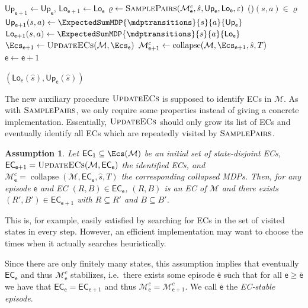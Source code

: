 \documentclass{theoretics}
\newcommand{\MDP}{\mathcal{M}}
\newcommand{\initialstate}{\hat{s}}
\newcommand{\finitepath}{\varrho}
\newcommand{\upperbound}{\mathsf{Up}}
\newcommand{\lowerbound}{\mathsf{Lo}}
\newcommand{\targetset}{T}
\newcommand{\samplepath}{\textsc{SamplePairs}}
\DeclareMathOperator{\collapse}{collapse}
\newcommand{\updateecs}{\textsc{UpdateECs}}
\newcommand{\algoepisode}{\mathsf{e}}
\newcommand{\algoecs}{\mathsf{EC}}
\newtheorem{assumption}{Assumption}
\begin{document}
\begin{algorithm}[t]
{ 		$\upperbound_{\algoepisode + 1} \gets \upperbound_\algoepisode$, $\lowerbound_{\algoepisode + 1} \gets \lowerbound_\algoepisode$ \;
 		$\finitepath \gets \samplepath(\MDP^c_\algoepisode, \initialstate, \upperbound_\algoepisode, \lowerbound_\algoepisode, \varepsilon)$   		
 		\ForAll(){$(s,a) \in \finitepath$}{ 
 			$\upperbound_{\algoepisode + 1}(s, a) \gets \ExpectedSumMDP{\mdptransitions}{s}{a}{\upperbound_\algoepisode}$ \label{alg:brtdp:line:update_u} \;
 			$\lowerbound_{\algoepisode + 1}(s, a) \gets \ExpectedSumMDP{\mdptransitions}{s}{a}{\lowerbound_\algoepisode}$ \label{alg:brtdp:line:update_l} \;
 		}
 		$\Ecs_{\algoepisode + 1} \gets \updateecs(\MDP, \Ecs_\algoepisode)$  
 		$\MDP^c_{\algoepisode + 1} \gets \collapse(\MDP, \Ecs_{\algoepisode + 1}, \initialstate, \targetset)$  \label{alg:brtdp:line:collapse} 		
 		$\algoepisode \gets \algoepisode + 1$ \;
 	}
 	
 	\Return $(\lowerbound_\algoepisode(\initialstate), \upperbound_\algoepisode(\initialstate))$ \;
 \end{algorithm}
 
The new auxiliary procedure $\updateecs$ is supposed to identify ECs in $\MDP$.
As with $\samplepath$, we only require some properties instead of giving a concrete implementation.
Essentially, $\updateecs$ should only grow its list of ECs and eventually identify all ECs which are repeatedly visited by $\samplepath$.

\begin{assumption} \label{asm:updateecs_growing}
	Let $\algoecs_1 \subseteq \Ecs(\MDP)$ be an initial set of state-disjoint ECs, $\algoecs_{\algoepisode+1} = \updateecs(\MDP, \algoecs_\algoepisode)$ the identified ECs, and $\MDP^c_\algoepisode = \collapse(\MDP, \algoecs_\algoepisode, \initialstate, \targetset)$ the corresponding collapsed MDPs.
	Then, for any episode $\algoepisode$ and EC $(R, B) \in \algoecs_\algoepisode$, $(R, B)$ is an EC of $\MDP$ and there exists $(R', B') \in \algoecs_{\algoepisode+1}$ with $R \subseteq R'$ and $B \subseteq B'$.
\end{assumption}
This is, for example, easily satisfied by searching for ECs in the set of visited states in every step.
However, an efficient implementation may want to choose the times when it actually searches heuristically.

Since there are only finitely many states, this assumption implies that eventually $\algoecs_\algoepisode$ and thus $\MDP^c_\algoepisode$ stabilizes, i.e.\ there exists some episode $\overline{\algoepisode}$ such that for all $\algoepisode \geq \overline{\algoepisode}$ we have that $\algoecs_\algoepisode = \algoecs_{\algoepisode+1}$ and thus $\MDP^c_\algoepisode = \MDP^c_{\algoepisode+1}$.
We call $\overline{\algoepisode}$ the \emph{EC-stable episode}.
\end{document}
